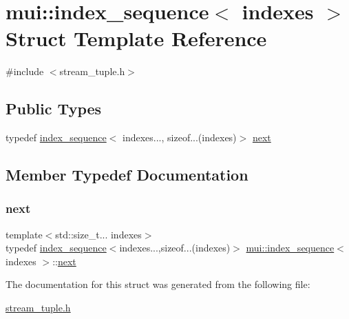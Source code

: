 \hypertarget{structmui_1_1index__sequence}{}\section{mui\+:\+:index\+\_\+sequence$<$ indexes $>$ Struct Template Reference}
\label{structmui_1_1index__sequence}


{\ttfamily \#include $<$stream\+\_\+tuple.\+h$>$}

\subsection*{Public Types}
\begin{DoxyCompactItemize}
\item 
typedef \hyperlink{structmui_1_1index__sequence}{index\+\_\+sequence}$<$ indexes..., sizeof...(indexes)$>$ \hyperlink{structmui_1_1index__sequence_adbb03aba08a84b248971aacec0d61d89}{next}
\end{DoxyCompactItemize}


\subsection{Member Typedef Documentation}
\mbox{\label{structmui_1_1index__sequence_adbb03aba08a84b248971aacec0d61d89}} 
\subsubsection{\texorpdfstring{next}{next}}
{\footnotesize\ttfamily template$<$std\+::size\+\_\+t... indexes$>$ \\
typedef \hyperlink{structmui_1_1index__sequence}{index\+\_\+sequence}$<$indexes...,sizeof...(indexes)$>$ \hyperlink{structmui_1_1index__sequence}{mui\+::index\+\_\+sequence}$<$ indexes $>$\+::\hyperlink{structmui_1_1index__sequence_adbb03aba08a84b248971aacec0d61d89}{next}}



The documentation for this struct was generated from the following file\+:\begin{DoxyCompactItemize}
\item 
\hyperlink{stream__tuple_8h}{stream\+\_\+tuple.\+h}\end{DoxyCompactItemize}
